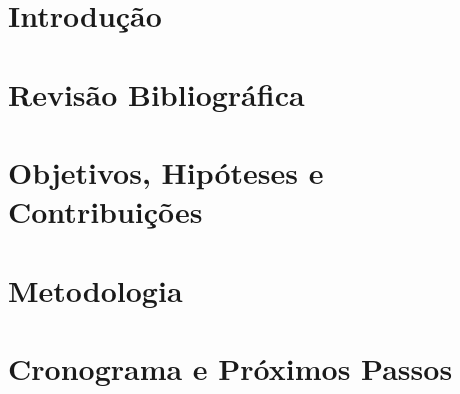 \documentclass[qualificacao]{packages/icmc}
\begin{document}
\textual

\chapter{Introdução}
\label{chapter:introducao}


\chapter{Revisão Bibliográfica}
\label{chapter:revisao-bibliografica}


\chapter{Objetivos, Hipóteses e Contribuições}
\label{chapter:objetivos}


\chapter{Metodologia}
\label{chapter:metodologia}


\chapter{Cronograma e Próximos Passos}
\label{chapter:cronograma}



%

%

%

%
\end{document}
